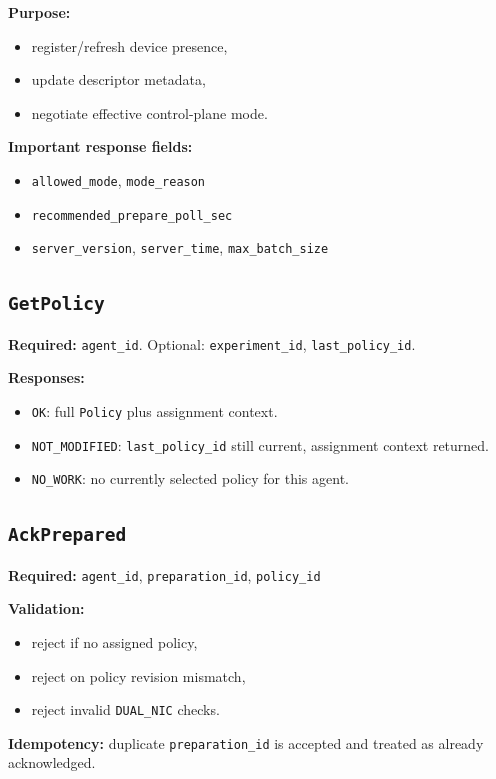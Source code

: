 \documentclass[11pt,a4paper]{article}
\begin{document}
\textbf{Purpose:}
\begin{itemize}
  \item register/refresh device presence,
  \item update descriptor metadata,
  \item negotiate effective control-plane mode.
\end{itemize}

\textbf{Important response fields:}
\begin{itemize}
  \item \texttt{allowed\_mode}, \texttt{mode\_reason}
  \item \texttt{recommended\_prepare\_poll\_sec}
  \item \texttt{server\_version}, \texttt{server\_time}, \texttt{max\_batch\_size}
\end{itemize}

\subsection{\texttt{GetPolicy}}
\textbf{Required:} \texttt{agent\_id}. Optional: \texttt{experiment\_id}, \texttt{last\_policy\_id}.

\textbf{Responses:}
\begin{itemize}
  \item \texttt{OK}: full \texttt{Policy} plus assignment context.
  \item \texttt{NOT\_MODIFIED}: \texttt{last\_policy\_id} still current, assignment context returned.
  \item \texttt{NO\_WORK}: no currently selected policy for this agent.
\end{itemize}

\subsection{\texttt{AckPrepared}}
\textbf{Required:} \texttt{agent\_id}, \texttt{preparation\_id}, \texttt{policy\_id}

\textbf{Validation:}
\begin{itemize}
  \item reject if no assigned policy,
  \item reject on policy revision mismatch,
  \item reject invalid \texttt{DUAL\_NIC} checks.
\end{itemize}

\textbf{Idempotency:}
duplicate \texttt{preparation\_id} is accepted and treated as already acknowledged.
\end{document}

